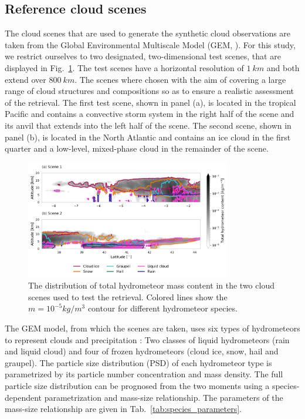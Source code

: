 \documentclass[journal abbreviation, manuscript]{copernicus}
\begin{document}
\subsection{Reference cloud scenes}

The cloud scenes that are used to generate the synthetic cloud observations are
taken from the Global Environmental Multiscale Model (GEM, \cite{cote98}). For
this study, we restrict ourselves to two designated, two-dimensional test
scenes, that are displayed in Fig.~\ref{fig:overview}. The test scenes have a
horizontal resolution of $1\ \unit{km}$ and both extend over $800\ \unit{km}$.
The scenes where chosen with the aim of covering a large range of cloud
structures and compositions so as to ensure a realistic assessment of the
retrieval. The first test scene, shown in panel (a), is located in the tropical
Pacific and contains a convective storm system in the right half of the scene
and its anvil that extends into the left half of the scene. The second scene,
shown in panel (b), is located in the North Atlantic and contains an  ice
cloud in the first quarter and a low-level, mixed-phase cloud in the remainder
of the scene.

\begin{figure}[h!]
\centering
\includegraphics[width = 0.8\textwidth]{../plots/scene_overview.png}
\caption{The distribution of total hydrometeor mass content in the two
cloud scenes used to test the retrieval. Colored lines show the
 $m = 10^{-5} \unit{kg/m^3}$ contour for different
 hydrometeor species.}
\label{fig:overview}
\end{figure}


The GEM model, from which the scenes are taken, uses six types of hydrometeors
to represent clouds and precipitation \citep{milbrandtyau05}: Two classes of
liquid hydrometeors (rain and liquid cloud) and four of frozen hydrometeors
(cloud ice, snow, hail and graupel). The particle size distribution (PSD) of
each hydrometeor type is parametrized by its particle number concentration and
mass density. The full particle size distribution can be prognosed from the two
moments using a species-dependent parametrization and mass-size relationship.
The parameters of the mass-size relationship are given in
Tab.~\ref{tab:species_parameters}.
\end{document}
